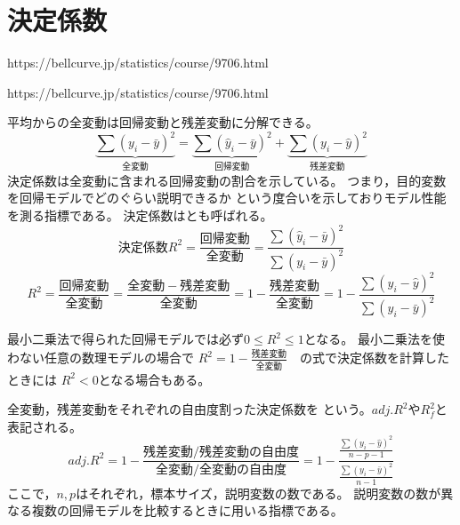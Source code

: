 \newcommand{\Draft}{}
\newcommand{\Slide}{}
\newcommand{\PrintLecture}{1}
\newcommand{\PrintSolution}{1}








\maketitle

\MyFrame{}{\tableofcontents}

\section{決定係数}

\MyFrame{}
{
  {https://bellcurve.jp/statistics/course/9706.html}
}

\MyFrame{}
{
  {https://bellcurve.jp/statistics/course/9706.html}
}

\MyFrame{}
{
  平均からの全変動は回帰変動と残差変動に分解できる。
  \[\underbrace{\sum(y_i-\bar{y})^2}_{全変動}
    =\underbrace{\sum(\hat{y}_i-\bar{y})^2}_{回帰変動}
    +\underbrace{\sum(y_i-\hat{y})^2}_{残差変動}\]
    決定係数は全変動に含まれる回帰変動の割合を示している。
    つまり，目的変数を回帰モデルでどのぐらい説明できるか
    という度合いを示しておりモデル性能を測る指標である。
    決定係数はとも呼ばれる。
  \[決定係数 R^2=\frac{回帰変動}{全変動}
    =\frac{\sum(\hat{y}_i-\bar{y})^2}{\sum(y_i-\bar{y})^2}\]
  \[R^2=\frac{回帰変動}{全変動}
    =\frac{全変動-残差変動}{全変動}=1-\frac{残差変動}{全変動}
    =1-\frac{\sum(y_i-\hat{y})^2}{\sum(y_i-\bar{y})^2}\]
}

{
  最小二乗法で得られた回帰モデルでは必ず$0\le R^2 \le 1$となる。
  最小二乗法を使わない任意の数理モデルの場合で
  $R^2=1-\frac{残差変動}{全変動}$　の式で決定係数を計算したときには
  $R^2 <0$となる場合もある。
}

{
  全変動，残差変動をそれぞれの自由度割った決定係数を
  という。$adj.R^2$や$R_f^2$と表記される。
  \[adj.R^2
    =1-\frac{残差変動/残差変動の自由度}{全変動/全変動の自由度}
    =1-\frac{\frac{\sum(y_i-\hat{y})^2}{n-p-1}}
            {\frac{\sum(y_i-\bar{y})^2}{n-1}}\]
  ここで，$n,p$はそれぞれ，標本サイズ，説明変数の数である。
  説明変数の数が異なる複数の回帰モデルを比較するときに用いる指標である。
}

